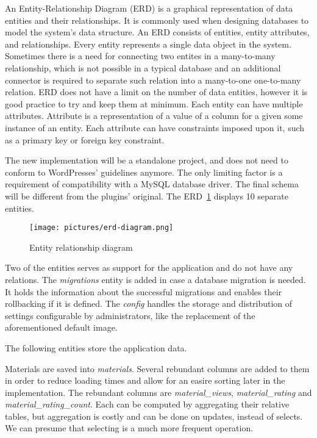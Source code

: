 \documentclass[
  digital,     %
  oneside,     %
  nosansbold,  %
  colorbold, %
  lof,         %
  lot,         %
]{fithesis4}
\begin{document}
An Entity-Relationship Diagram (ERD) is a graphical representation of data entities and their relationships. It is commonly used when designing databases to model the system's data structure. An ERD consists of entities, entity attributes, and relationships. Every entity represents a single data object in the system. Sometimes there is a need for connecting two entites in a many-to-many relationship, which is not possible in a typical database and an additional connector is required to separate such relation into a many-to-one one-to-many relation. ERD does not have a limit on the number of data entities, however it is good practice to try and keep them at minimum. Each entity can have multiple attributes. Attribute is a representation of a value of a column for a given some instance of an entity. Each attribute can have constraints imposed upon it, such as a primary key or foreign key constraint.

The new implementation will be a standalone project, and does not need to conform to WordPresses' guidelines anymore. The only limiting factor is a requirement of compatibility with a MySQL database driver. The final schema will be different from the plugins' original. The ERD~\ref{fig:erd} displays 10 separate entities.

\begin{figure}
	\begin{center}
		\begin{minipage}{1\textwidth}
			\texttt{[image: pictures/erd-diagram.png]}
		\end{minipage}
	\end{center}
	\caption{Entity relationship diagram}
	\label{fig:erd}
\end{figure}

Two of the entities serves as support for the application and do not have any relations. The \textit{migrations} entity is added in case a database migration is needed. It holds the information about the successful migrations and enables their rollbacking if it is defined. The \textit{config} handles the storage and distribution of settings configurable by administrators, like the replacement of the aforementioned default image.

The following entities store the application data.

Materials are saved into \textit{materials}. Several rebundant columns are added to them in order to reduce loading times and allow for an easire sorting later in the implementation. The rebundant columns are \textit{material\_views}, \textit{material\_rating} and \textit{material\_rating\_count}. Each can be computed by aggregating their relative tables, but aggregation is costly and can be done on updates, instead of selects. We can presume that selecting is a much more frequent operation.
\end{document}
